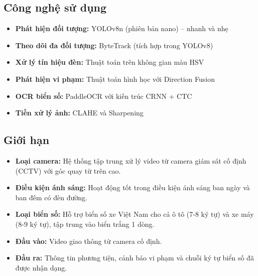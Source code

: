 \subsection{Công nghệ sử dụng}
\begin{itemize}
    \item \textbf{Phát hiện đối tượng:} YOLOv8n (phiên bản nano) -- nhanh và nhẹ
    \item \textbf{Theo dõi đa đối tượng:} ByteTrack (tích hợp trong YOLOv8)
    \item \textbf{Xử lý tín hiệu đèn:} Thuật toán trên không gian màu HSV
    \item \textbf{Phát hiện vi phạm:} Thuật toán hình học với Direction Fusion
    \item \textbf{OCR biển số:} PaddleOCR với kiến trúc CRNN + CTC
    \item \textbf{Tiền xử lý ảnh:} CLAHE và Sharpening
\end{itemize}

\subsection{Giới hạn}
\begin{itemize}
    \item \textbf{Loại camera:} Hệ thống tập trung xử lý video từ camera giám sát cố định (CCTV) với góc quay từ trên cao.
    \item \textbf{Điều kiện ánh sáng:} Hoạt động tốt trong điều kiện ánh sáng ban ngày và ban đêm có đèn đường.
    \item \textbf{Loại biển số:} Hỗ trợ biển số xe Việt Nam cho cả ô tô (7-8 ký tự) và xe máy (8-9 ký tự), tập trung vào biển trắng 1 dòng.
    \item \textbf{Đầu vào:} Video giao thông từ camera cố định.
    \item \textbf{Đầu ra:} Thông tin phương tiện, cảnh báo vi phạm và chuỗi ký tự biển số đã được nhận dạng.
\end{itemize}

